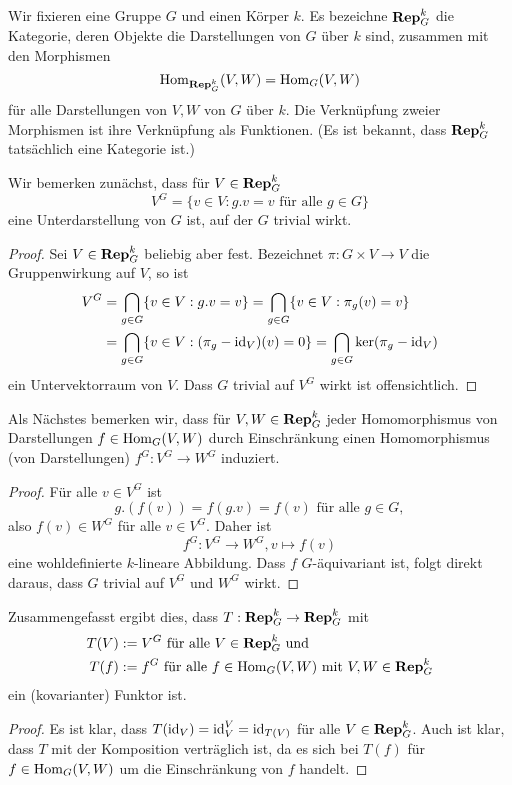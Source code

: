 \documentclass[a4paper,10pt]{article}
\begin{document}
\subsection{}
\begin{bem}
Wir fixieren eine Gruppe $G$ und einen Körper $k$. Es bezeichne $\mathbf{Rep}_G^k$ die Kategorie, deren Objekte die Darstellungen von $G$ über $k$ sind, zusammen mit den Morphismen
\[
 \operatorname{Hom}_{\mathbf{Rep}_G^k}(V,W) = \operatorname{Hom}_G(V,W)
\]
für alle Darstellungen von $V,W$ von $G$ über $k$. Die Verknüpfung zweier Morphismen ist ihre Verknüpfung als Funktionen. (Es ist bekannt, dass $\mathbf{Rep}_G^k$ tatsächlich eine Kategorie ist.)

Wir bemerken zunächst, dass für $V \in \mathbf{Rep}_G^k$
\[
 V^G = \{v \in V : g.v = v \text{ für alle } g \in G\}
\]
eine Unterdarstellung von $G$ ist, auf der $G$ trivial wirkt.

\begin{proof}
 Sei $V \in \mathbf{Rep}_G^k$ beliebig aber fest. Bezeichnet $\pi : G \times V \to V$ die Gruppenwirkung auf $V$, so ist
 \begin{align*}
  V^G
  &= \bigcap_{g \in G} \{v \in V : g.v = v\}
  = \bigcap_{g \in G} \{v \in V : \pi_g(v) = v\} \\
  &= \bigcap_{g \in G} \{v \in V : (\pi_g-\operatorname{id}_V)(v) = 0\}
  = \bigcap_{g \in G} \ker(\pi_g - \operatorname{id}_V)
 \end{align*}
 ein Untervektorraum von $V$. Dass $G$ trivial auf $V^G$ wirkt ist offensichtlich.
\end{proof}

Als Nächstes bemerken wir, dass für $V,W \in \mathbf{Rep}_G^k$ jeder Homomorphismus von Darstellungen $f \in \operatorname{Hom}_G(V,W)$ durch Einschränkung einen Homomorphismus (von Darstellungen) $f^G : V^G \to W^G$ induziert.
\begin{proof}
 Für alle $v \in V^G$ ist
 \[
  g.(f(v)) = f(g.v) = f(v) \text{ für alle } g \in G,
 \]
 also $f(v) \in W^G$ für alle $v \in V^G$. Daher ist
 \[
  f^G : V^G \to W^G, v \mapsto f(v)
 \]
 eine wohldefinierte $k$-lineare Abbildung. Dass $f$ $G$-äquivariant ist, folgt direkt daraus, dass $G$ trivial auf $V^G$ und $W^G$ wirkt.
\end{proof}

Zusammengefasst ergibt dies, dass $T : \mathbf{Rep}_G^k \to \mathbf{Rep}_G^k$ mit
\begin{align*}
 T(V) &:= V^G \text{ für alle } V \in \mathbf{Rep}_G^k \text{ und } \\
 T(f) &:= f^G \text{ für alle } f \in \operatorname{Hom}_G(V,W) \text{ mit } V,W \in \mathbf{Rep}_G^k
\end{align*}
ein (kovarianter) Funktor ist.

\begin{proof}
  Es ist klar, dass $T(\operatorname{id}_V) = \operatorname{id}_V^V = \operatorname{id}_{T(V)}$ für alle $V \in \mathbf{Rep}_G^k$. Auch ist klar, dass $T$ mit der Komposition verträglich ist, da es sich bei $T(f)$ für $f \in \operatorname{Hom}_G(V,W)$ um die Einschränkung von $f$ handelt.
\end{proof}
\end{bem}
\end{document}
